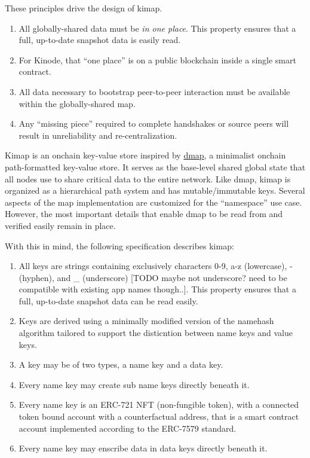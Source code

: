 \documentclass[runningheads]{llncs}
\begin{document}
These principles drive the design of kimap.
\begin{enumerate}
    \item All globally-shared data must be \textit{in one place}.
    This property ensures that a full, up-to-date snapshot data is easily read.
    \item For Kinode, that ``one place'' is on a public blockchain inside a single smart contract.
    \item All data necessary to bootstrap peer-to-peer interaction must be available within the globally-shared map.
    \item Any ``missing piece'' required to complete handshakes or source peers will result in unreliability and re-centralization.
\end{enumerate}

Kimap is an onchain key-value store inspired by \href{https://github.com/dapphub/dmap}{dmap}, a minimalist onchain path-formatted key-value store.
It serves as the base-level shared global state that all nodes use to share critical data to the entire network.
Like dmap, kimap is organized as a hierarchical path system and has mutable/immutable keys.
Several aspects of the map implementation are customized for the ``namespace'' use case.
However, the most important details that enable dmap to be read from and verified easily remain in place.

With this in mind, the following specification describes kimap:

\begin{enumerate}
    \item All keys are strings containing exclusively characters 0-9, a-z (lowercase), - (hyphen), and \_ (underscore) [TODO maybe not underscore? need to be compatible with existing app names though..].
    This property ensures that a full, up-to-date snapshot data can be read easily.
    \item Keys are derived using a minimally modified version of the namehash algorithm tailored to support the disticntion between name keys and value keys.
    \item A key may be of two types, a name key and a data key.
    \item Every name key may create sub name keys directly beneath it.
    \item Every name key is an ERC-721 NFT (non-fungible token), 
    with a connected token bound account with a counterfactual address, 
    that is a smart contract account implemented according to the ERC-7579 standard.
    \item Every name key may enscribe data in data keys directly beneath it.
\end{enumerate}
\end{document}
